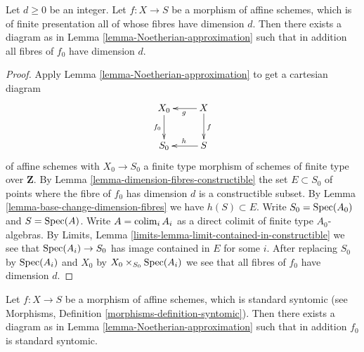 \begin{lemma}
\label{lemma-Noetherian-approximation-dimension-d}
Let $d \geq 0$ be an integer.
Let $f : X \to S$ be a morphism of affine schemes, which is
of finite presentation all of whose fibres have dimension $d$.
Then there exists a diagram as in
Lemma \ref{lemma-Noetherian-approximation}
such that in addition all fibres of $f_0$ have dimension $d$.
\end{lemma}

\begin{proof}
Apply
Lemma \ref{lemma-Noetherian-approximation}
to get a cartesian diagram
$$
\xymatrix{
X_0 \ar[d]_{f_0} & X \ar[l]^g \ar[d]^f \\
S_0 & S \ar[l]_h
}
$$
of affine schemes with $X_0 \to S_0$ a finite type morphism of
schemes of finite type over $\mathbf{Z}$. By
Lemma \ref{lemma-dimension-fibres-constructible}
the set $E \subset S_0$ of points where the fibre of
$f_0$ has dimension $d$ is a constructible subset. By
Lemma \ref{lemma-base-change-dimension-fibres}
we have $h(S) \subset E$. Write $S_0 = \mathop{\rm Spec}(A_0)$ and
$S = \mathop{\rm Spec}(A)$. Write $A = \mathop{\rm colim}\nolimits_i A_i$ as a
direct colimit of finite type $A_0$-algebras. By
Limits, Lemma \ref{limits-lemma-limit-contained-in-constructible}
we see that $\mathop{\rm Spec}(A_i) \to S_0$ has image contained in $E$
for some $i$. After replacing $S_0$ by $\mathop{\rm Spec}(A_i)$ and
$X_0$ by $X_0 \times_{S_0} \mathop{\rm Spec}(A_i)$ we see that
all fibres of $f_0$ have dimension $d$.
\end{proof}

\begin{lemma}
\label{lemma-Noetherian-approximation-standard-syntomic}
Let $f : X \to S$ be a morphism of affine schemes, which is
standard syntomic (see
Morphisms, Definition \ref{morphisms-definition-syntomic}).
Then there exists a diagram as in
Lemma \ref{lemma-Noetherian-approximation}
such that in addition $f_0$ is standard syntomic.
\end{lemma}

